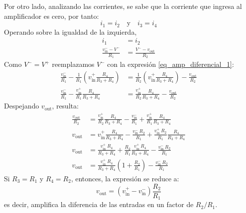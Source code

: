 Por otro lado, analizando las corrientes, se sabe que la corriente que ingresa al amplificador es cero, por tanto:
\[
i_1=i_2 \quad \text{y} \quad i_3=i_4
\]
Operando sobre la igualdad de la izquierda,
\begin{align*}
  i_1 &= i_2 \\ 
  \frac{v_\text{in}^- -V^-}{R_1} &= \frac{V^- -v_\text{out}}{R_2}
\end{align*}
Como \(V^-=V^+\) reemplazamos \(V^-\) con la expresión \eqref{eq_amp_diferencial_1}:
\begin{align*}
  \frac{v_\text{in}^{-}}{R_1} - \frac{1}{R_1} \left(v_\text{in}^{+} \frac{R_4}{R_3+R_4}\right) &= \frac{1}{R_2}\left(v_\text{in}^{+} \frac{R_4}{R_3+R_4}\right) - \frac{v_\text{out}}{R_2}\\ 
  \frac{v_\text{in}^-}{R_1}- \frac{v_\text{in}^+}{R_1} \frac{R_4}{R_3+R_4} &= \frac{v_\text{in}^+}{R_2}\frac{R_4}{R_3+R_4} - \frac{v_\text{out}}{R_2}
\end{align*}
Despejando \(v_\text{out}\), resulta:
\begin{align*}
  \frac{v_\text{out}}{R_2} &= \frac{v_\text{in}^+}{R_2}\frac{R_4}{R_3+R_4} - \frac{v_\text{in}^-}{R_1} + \frac{v_\text{in}^+}{R_1} \frac{R_4}{R_3+R_4} \\ 
  v_\text{out} &= v_\text{in}^+\frac{R_4}{R_3+R_4} - \frac{v_\text{in}^- ~ R_2}{R_1} + \frac{v_\text{in}^+ ~ R_2}{R_1} \frac{R_4}{R_3+R_4} \\ 
  v_\text{out} &= \frac{v_\text{in}^+ ~ R_4}{R_3+R_4} + \frac{R_2}{R_1} \frac{v_\text{in}^+ ~ R_4}{R_3+R_4} - \frac{v_\text{in}^- ~ R_2}{R_1} \\ 
  v_\text{out} &= \frac{v_\text{in}^+ ~ R_4}{R_3+R_4}\left(1+\frac{R_2}{R_1}\right) - \frac{v_\text{in}^- ~ R_2}{R_1}
\end{align*}
Si \(R_3=R_1\) y \(R_4=R_2\), entonces, la expresión se reduce a: 
\[
  v_\text{out} = (v_\text{in}^+ - v_\text{in}^-) \frac{R_2}{R_1}
\]
es decir, amplifica la diferencia de las entradas en un factor de \(R_2/R_1\).
